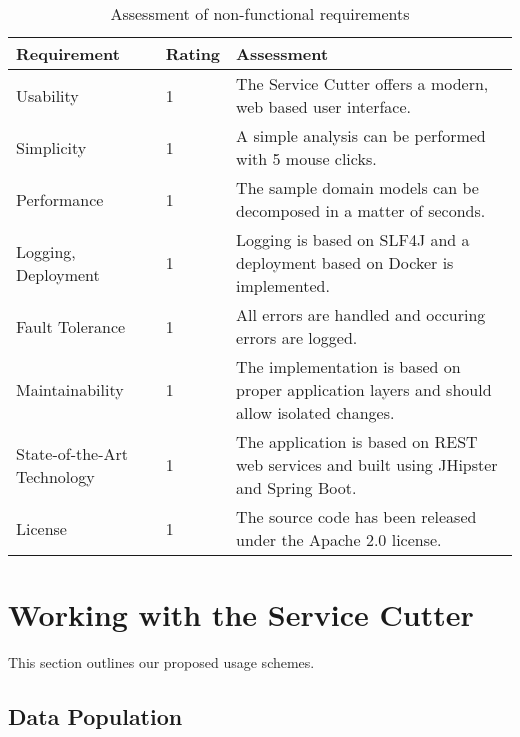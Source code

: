 \begin{table}[H]
	\centering
	\caption{Assessment of non-functional requirements}
	\label{tab:conclusionNonFunctional}
	\begin{tabular}{|p{100pt}|l|p{250pt}|}
	\hline \textbf{Requirement} & \textbf{Rating} & \textbf{Assessment} \\ 
	\hline Usability & 1 & The Service Cutter offers a modern, web based user interface. \\
	\hline Simplicity & 1 & A simple analysis can be performed with 5 mouse clicks. \\
	\hline Performance & 1 & The sample domain models can be decomposed in a matter of seconds. \\ %
	\hline Logging, Deployment & 1 & Logging is based on SLF4J and a deployment based on Docker is implemented. \\
	\hline Fault Tolerance & 1 & All errors are handled and occuring errors are logged. \\
	\hline Maintainability & 1 & The implementation is based on proper application layers and should allow isolated changes. \\
	\hline State-of-the-Art Technology & 1 & The application is based on REST web services and built using JHipster and Spring Boot. \\
	\hline License & 1 & The source code has been released under the Apache 2.0 license. \\
	\hline 
	\end{tabular} 
\end{table}


\section{Working with the Service Cutter} %

This section outlines our proposed usage schemes.



\subsection{Data Population}



